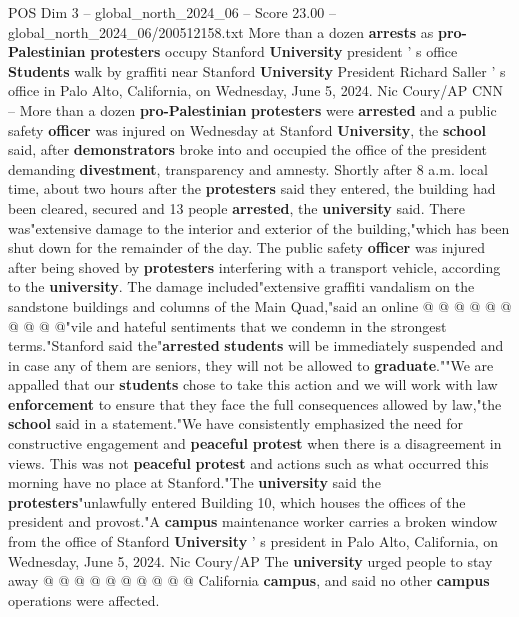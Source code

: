 \begin{textsample}{POS Dim 3 – global\_north\_2024\_06 – Score 23.00 – global\_north\_2024\_06/200512158.txt}  \label{ex:f3_pos_066}
More than a dozen \textbf{arrests} as \textbf{pro-Palestinian} \textbf{protesters} occupy Stanford \textbf{University} president ' s office \textbf{Students} walk by graffiti near Stanford \textbf{University} President Richard Saller ' s office in Palo Alto, California, on Wednesday, June 5, 2024.
Nic Coury/AP CNN -- More than a dozen \textbf{pro-Palestinian} \textbf{protesters} were \textbf{arrested} and a public safety \textbf{officer} was injured on Wednesday at Stanford \textbf{University}, the \textbf{school} said, after \textbf{demonstrators} broke into and occupied the office of the president demanding \textbf{divestment}, transparency and amnesty.
Shortly after 8 a.m. local time, about two hours after the \textbf{protesters} said they entered, the building had been cleared, secured and 13 people \textbf{arrested}, the \textbf{university} said.
There was"extensive damage to the interior and exterior of the building,"which has been shut down for the remainder of the day.
The public safety \textbf{officer} was injured after being shoved by \textbf{protesters} interfering with a transport vehicle, according to the \textbf{university}.
The damage included"extensive graffiti vandalism on the sandstone buildings and columns of the Main Quad,"said an online @ @ @ @ @ @ @ @ @ @"vile and hateful sentiments that we condemn in the strongest terms."Stanford said the"\textbf{arrested} \textbf{students} will be immediately suspended and in case any of them are seniors, they will not be allowed to \textbf{graduate}.""We are appalled that our \textbf{students} chose to take this action and we will work with law \textbf{enforcement} to ensure that they face the full consequences allowed by law,"the \textbf{school} said in a statement."We have consistently emphasized the need for constructive engagement and \textbf{peaceful} \textbf{protest} when there is a disagreement in views.
This was not \textbf{peaceful} \textbf{protest} and actions such as what occurred this morning have no place at Stanford."The \textbf{university} said the \textbf{protesters}"unlawfully entered Building 10, which houses the offices of the president and provost."A \textbf{campus} maintenance worker carries a broken window from the office of Stanford \textbf{University} ' s president in Palo Alto, California, on Wednesday, June 5, 2024.
Nic Coury/AP The \textbf{university} urged people to stay away @ @ @ @ @ @ @ @ @ @ California \textbf{campus}, and said no other \textbf{campus} operations were affected.

\end{textsample}
